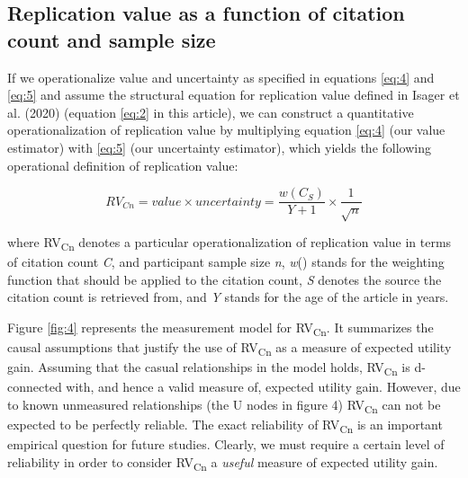 \documentclass[
  english,
  jou,floatsintext]{apa6}
\begin{document}
\hypertarget{replication-value-as-a-function-of-citation-count-and-sample-size}{%
\subsection{Replication value as a function of citation count and sample size}\label{replication-value-as-a-function-of-citation-count-and-sample-size}}

If we operationalize value and uncertainty as specified in equations \eqref{eq:4} and \eqref{eq:5} and assume the structural equation for replication value defined in Isager et al. (2020) (equation \eqref{eq:2} in this article), we can construct a quantitative operationalization of replication value by multiplying equation \eqref{eq:4} (our value estimator) with \eqref{eq:5} (our uncertainty estimator), which yields the following operational definition of replication value:

\begin{equation} 
  \tag{6}
  RV_{Cn} = value\times uncertainty = \frac{w(C_{S})}{Y+1}\times\frac{1}{\sqrt{n}}
  \label{eq:6}
\end{equation}

where RV\textsubscript{Cn} denotes a particular operationalization of replication value in terms of citation count \emph{C}, and participant sample size \emph{n}, \emph{w}() stands for the weighting function that should be applied to the citation count, \emph{S} denotes the source the citation count is retrieved from, and \emph{Y} stands for the age of the article in years.

Figure \ref{fig:4} represents the measurement model for RV\textsubscript{Cn}. It summarizes the causal assumptions that justify the use of RV\textsubscript{Cn} as a measure of expected utility gain. Assuming that the casual relationships in the model holds, RV\textsubscript{Cn} is d-connected with, and hence a valid measure of, expected utility gain. However, due to known unmeasured relationships (the U nodes in figure 4) RV\textsubscript{Cn} can not be expected to be perfectly reliable. The exact reliability of RV\textsubscript{Cn} is an important empirical question for future studies. Clearly, we must require a certain level of reliability in order to consider RV\textsubscript{Cn} a \emph{useful} measure of expected utility gain.
\end{document}
